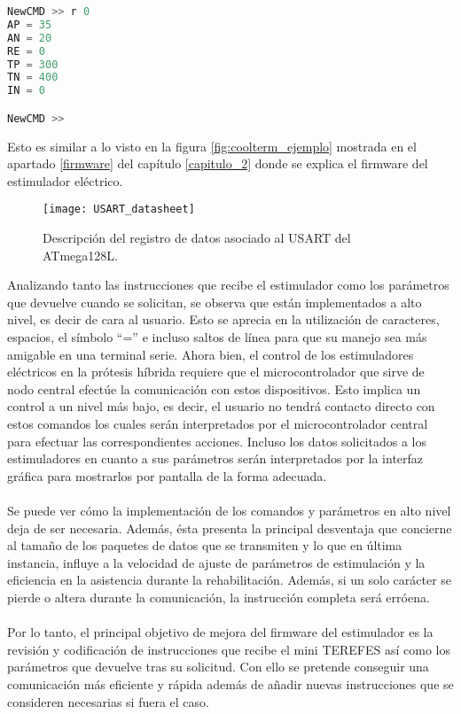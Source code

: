 \begin{lstlisting}[language=C++,breaklines]
NewCMD >> r 0
AP = 35
AN = 20
RE = 0
TP = 300
TN = 400
IN = 0

NewCMD >>
\end{lstlisting}

Esto es similar a lo visto en la figura \ref{fig:coolterm_ejemplo} mostrada en el apartado \ref{firmware} del capítulo \ref{capitulo_2} donde se explica el firmware del estimulador eléctrico.\\

\begin{figure}[!htb]
\centering
\texttt{[image: USART\_datasheet]}
  \caption{Descripción del registro de datos asociado al USART del ATmega128L\cite{atmega128l_datasheet}.}\label{fig:USART_datasheet}
\end{figure}  

Analizando tanto las instrucciones que recibe el estimulador como los parámetros que devuelve cuando se solicitan, se observa que están implementados a alto nivel, es decir de cara al usuario. Esto se aprecia en la utilización de caracteres, espacios, el símbolo ``='' e incluso saltos de línea para que su manejo sea más amigable en una terminal serie. Ahora bien, el control de los estimuladores eléctricos en la prótesis híbrida requiere que el microcontrolador que sirve de nodo central efectúe la comunicación con estos dispositivos. Esto implica un control a un nivel más bajo, es decir, el usuario no tendrá contacto directo con estos comandos los cuales serán interpretados por el microcontrolador central para efectuar las correspondientes acciones. Incluso los datos solicitados a los estimuladores en cuanto a sus parámetros serán interpretados por la interfaz gráfica para mostrarlos por pantalla de la forma adecuada. 
\\
\\
Se puede ver cómo la implementación de los comandos y parámetros en alto nivel deja de ser necesaria. Además, ésta presenta la principal desventaja que concierne al tamaño de los paquetes de datos que se transmiten y lo que en última instancia, influye a la velocidad de ajuste de parámetros de estimulación y la eficiencia en la asistencia durante la rehabilitación. Además, si un solo carácter se pierde o altera durante la comunicación, la instrucción completa será erróena.
\\
\\
Por lo tanto, el principal objetivo de mejora del firmware del estimulador es la revisión y codificación de instrucciones que recibe el mini TEREFES así como los parámetros que devuelve tras su solicitud. Con ello se pretende conseguir una comunicación más eficiente y rápida además de añadir nuevas instrucciones que se consideren necesarias si fuera el caso.



